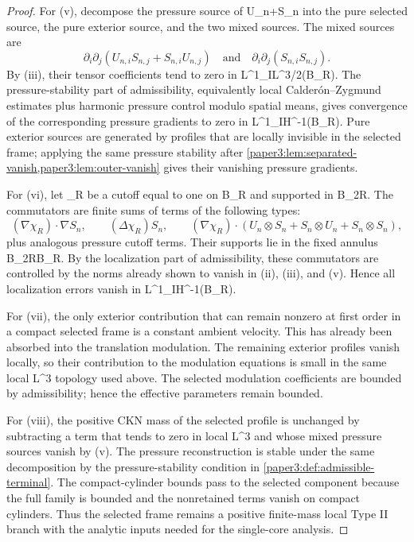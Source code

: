 \documentclass[11pt]{amsart}
\def\({}%
\def\){}%
\theoremstyle{plain}
\theoremstyle{definition}
\theoremstyle{remark}
\begin{document}
\begin{proof}
For \((v)\), decompose the pressure source of \(U_n+S_n\) into the pure selected
source, the pure exterior source, and the two mixed sources.  The mixed sources
are
\[
  \partial_i\partial_j(U_{n,i}S_{n,j}+S_{n,i}U_{n,j})
  \quad\text{and}\quad
  \partial_i\partial_j(S_{n,i}S_{n,j}).
\]
By \((iii)\), their tensor coefficients tend to zero in
\(L^1_IL^{3/2}(B_R)\).  The pressure-stability part of admissibility,
equivalently local Calder\'on--Zygmund estimates plus harmonic pressure control
modulo spatial means, gives convergence of the corresponding pressure gradients
to zero in \(L^1_IH^{-1}(B_R)\).  Pure exterior sources are generated by
profiles that are locally invisible in the selected frame; applying the same
pressure stability after \cref{paper3:lem:separated-vanish,paper3:lem:outer-vanish} gives
their vanishing pressure gradients.

For \((vi)\), let \(\chi_R\) be a cutoff equal to one on \(B_R\) and supported
in \(B_{2R}\).  The commutators are finite sums of terms of the following
types:
\[
  (\nabla\chi_R)\cdot\nabla S_n,
  \qquad
  (\Delta\chi_R)S_n,
  \qquad
  (\nabla\chi_R)\cdot (U_n\otimes S_n+S_n\otimes U_n+S_n\otimes S_n),
\]
plus analogous pressure cutoff terms.  Their supports lie in the fixed annulus
\(B_{2R}\setminus B_R\).  By the localization part of admissibility, these
commutators are controlled by the norms already shown to vanish in \((ii)\),
\((iii)\), and \((v)\).  Hence all localization errors vanish in
\(L^1_IH^{-1}(B_R)\).

For \((vii)\), the only exterior contribution that can remain nonzero at first
order in a compact selected frame is a constant ambient velocity.  This has
already been absorbed into the translation modulation.  The remaining exterior
profiles vanish locally, so their contribution to the modulation equations is
small in the same local \(L^3\) topology used above.  The selected modulation
coefficients are bounded by admissibility; hence the effective parameters remain
bounded.

For \((viii)\), the positive CKN mass of the selected profile is unchanged by
subtracting a term that tends to zero in local \(L^3\) and whose
mixed pressure sources vanish by \((v)\).  The pressure reconstruction is stable
under the same decomposition by the pressure-stability condition in
\cref{paper3:def:admissible-terminal}.  The compact-cylinder bounds pass to the
selected component because the full family is bounded and the nonretained terms
vanish on compact cylinders.  Thus the selected frame remains a positive
finite-mass local Type II branch with the analytic inputs needed for the
single-core analysis.
\end{proof}
\end{document}
